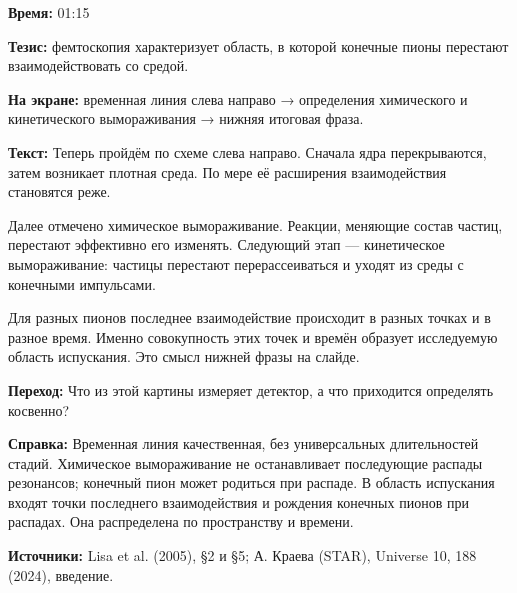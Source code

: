 \textbf{Время:} 01:15

\textbf{Тезис:} фемтоскопия характеризует область, в которой конечные пионы перестают взаимодействовать со средой.

\textbf{На экране:} временная линия слева направо → определения химического и кинетического вымораживания → нижняя итоговая фраза.

\textbf{Текст:} Теперь пройдём по схеме слева направо. Сначала ядра перекрываются, затем возникает плотная среда. По мере её расширения взаимодействия становятся реже.

Далее отмечено химическое вымораживание. Реакции, меняющие состав частиц, перестают эффективно его изменять. Следующий этап — кинетическое вымораживание: частицы перестают перерассеиваться и уходят из среды с конечными импульсами.

Для разных пионов последнее взаимодействие происходит в разных точках и в разное время. Именно совокупность этих точек и времён образует исследуемую область испускания. Это смысл нижней фразы на слайде.

\textbf{Переход:} Что из этой картины измеряет детектор, а что приходится определять косвенно?

\textbf{Справка:} Временная линия качественная, без универсальных длительностей стадий. Химическое вымораживание не останавливает последующие распады резонансов; конечный пион может родиться при распаде. В область испускания входят точки последнего взаимодействия и рождения конечных пионов при распадах. Она распределена по пространству и времени.

\textbf{Источники:} Lisa et al. (2005), §2 и §5; А. Краева (STAR), Universe 10, 188 (2024), введение.
